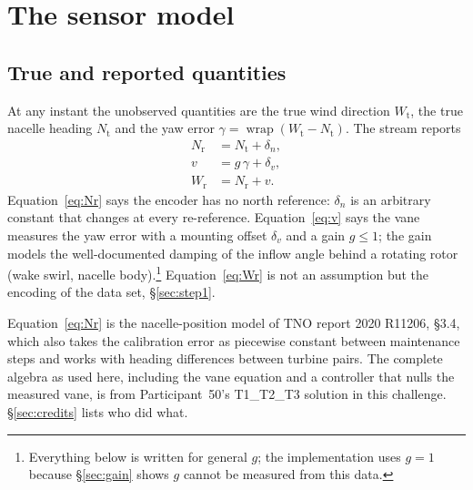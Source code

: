\documentclass[11pt,a4paper]{article}
\theoremstyle{remark}
\newcommand{\wrap}{\operatorname{wrap}}
\newcommand{\Wt}{W_{\mathrm{t}}}
\newcommand{\Nt}{N_{\mathrm{t}}}
\newcommand{\Wr}{W_{\mathrm{r}}}
\newcommand{\Nr}{N_{\mathrm{r}}}
\begin{document}
\section{The sensor model}\label{sec:sensor}

\subsection{True and reported quantities}
At any instant the unobserved quantities are the true wind direction $\Wt$, the
true nacelle heading $\Nt$ and the yaw error $\gamma=\wrap(\Wt-\Nt)$. The stream
reports
\begin{align}
  \Nr &= \Nt + \delta_n, \label{eq:Nr}\\
  v   &= g\,\gamma + \delta_v, \label{eq:v}\\
  \Wr &= \Nr + v . \label{eq:Wr}
\end{align}
Equation~\eqref{eq:Nr} says the encoder has no north reference: $\delta_n$ is an
arbitrary constant that changes at every re-reference. Equation~\eqref{eq:v}
says the vane measures the yaw error with a mounting offset $\delta_v$ and a gain
$g\le1$; the gain models the well-documented damping of the inflow angle behind a
rotating rotor (wake swirl, nacelle body).\footnote{Everything below is written
for general $g$; the implementation uses $g=1$ because \S\ref{sec:gain} shows $g$
cannot be measured from this data.} Equation~\eqref{eq:Wr} is not an
assumption but the encoding of the data set, \S\ref{sec:step1}.

Equation~\eqref{eq:Nr} is the nacelle-position model of TNO report 2020 R11206,
\S3.4, which also takes the calibration error as piecewise constant between
maintenance steps and works with heading differences between turbine pairs. The
complete algebra as used here, including the vane equation and a controller
that nulls the measured vane, is from Participant~50's T1\_T2\_T3 solution in
this challenge. \S\ref{sec:credits} lists who did what.
\end{document}
